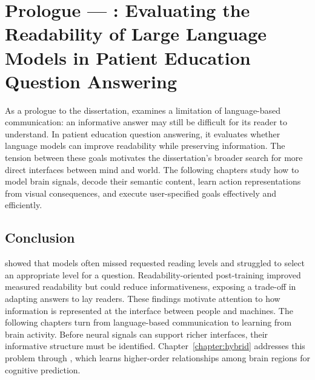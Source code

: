 \chapter[Prologue --- \repqa]{Prologue --- \repqa: Evaluating the Readability of Large Language Models in Patient Education Question Answering}
\label{chapter:repqa}

As a prologue to the dissertation, \repqa{} examines a limitation of language-based communication: an informative answer may still be difficult for its reader to understand. In patient education question answering, it evaluates whether language models can improve readability while preserving information. The tension between these goals motivates the dissertation's broader search for more direct interfaces between mind and world. The following chapters study how to model brain signals, decode their semantic content, learn action representations from visual consequences, and execute user-specified goals effectively and efficiently.






\section{Conclusion}

\repqa{} showed that models often missed requested reading levels and struggled to select an appropriate level for a question. Readability-oriented post-training improved measured readability but could reduce informativeness, exposing a trade-off in adapting answers to lay readers. These findings motivate attention to how information is represented at the interface between people and machines. The following chapters turn from language-based communication to learning from brain activity. Before neural signals can support richer interfaces, their informative structure must be identified. Chapter~\ref{chapter:hybrid} addresses this problem through \hybrid{}, which learns higher-order relationships among brain regions for cognitive prediction.
